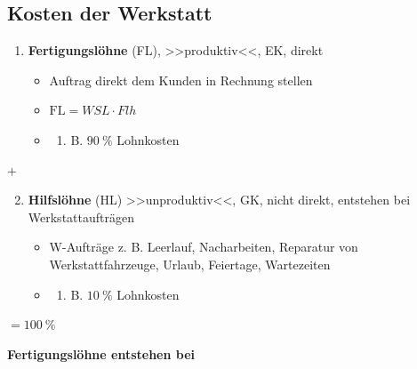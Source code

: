 \newpage

\subsection{Kosten der Werkstatt}\label{kosten-der-werkstatt}

\begin{enumerate}
\item
  \textbf{Fertigungslöhne} (FL), >>produktiv<<, EK, direkt

  \begin{itemize}
  \item
    Auftrag direkt dem Kunden in Rechnung stellen
  \item
    $\boxed{\text{FL} = WSL \cdot Flh}$
  \item
    \begin{enumerate}
    \def\labelenumii{\alph{enumii}.}
    \setcounter{enumii}{25}
    \item
      B. $90~\%$ Lohnkosten
    \end{enumerate}
  \end{itemize}
\end{enumerate}

$+$

\begin{enumerate}
\setcounter{enumi}{1}
\item
  \textbf{Hilfslöhne} (HL) >>unproduktiv<<, GK, nicht direkt, entstehen
  bei Werkstattaufträgen

  \begin{itemize}
  \item
    W-Aufträge z. B. Leerlauf, Nacharbeiten, Reparatur von
    Werkstattfahrzeuge, Urlaub, Feiertage, Wartezeiten
  \item
    \begin{enumerate}
    \def\labelenumii{\alph{enumii}.}
    \setcounter{enumii}{25}
    \item
      B. $10~\%$ Lohnkosten
    \end{enumerate}
  \end{itemize}
\end{enumerate}

$= 100~\%$

\textbf{Fertigungslöhne entstehen bei}

